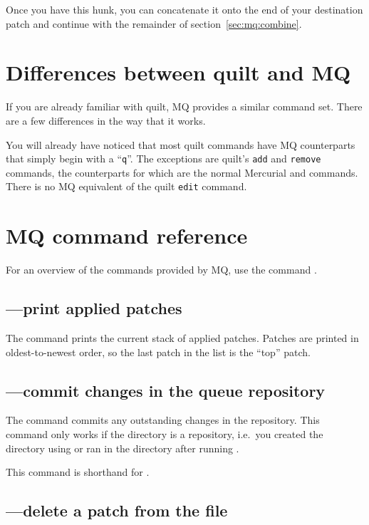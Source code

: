 Once you have this hunk, you can concatenate it onto the end of your
destination patch and continue with the remainder of
section~\ref{sec:mq:combine}.

\section{Differences between quilt and MQ}

If you are already familiar with quilt, MQ provides a similar command
set.  There are a few differences in the way that it works.

You will already have noticed that most quilt commands have MQ
counterparts that simply begin with a ``\texttt{q}''.  The exceptions
are quilt's \texttt{add} and \texttt{remove} commands, the
counterparts for which are the normal Mercurial  and
 commands.  There is no MQ equivalent of the quilt
\texttt{edit} command.

\section{MQ command reference}
\label{sec:mq:cmdref}

For an overview of the commands provided by MQ, use the command
.

\subsection{---print applied patches}

The  command prints the current stack of applied
patches.  Patches are printed in oldest-to-newest order, so the last
patch in the list is the ``top'' patch.

\subsection{---commit changes in the queue repository}

The  command commits any outstanding changes in the
 repository.  This command only works if the
 directory is a repository, i.e.~you created the
directory using  or ran
 in the directory after running .

This command is shorthand for .

\subsection{---delete a patch from the
   file}

